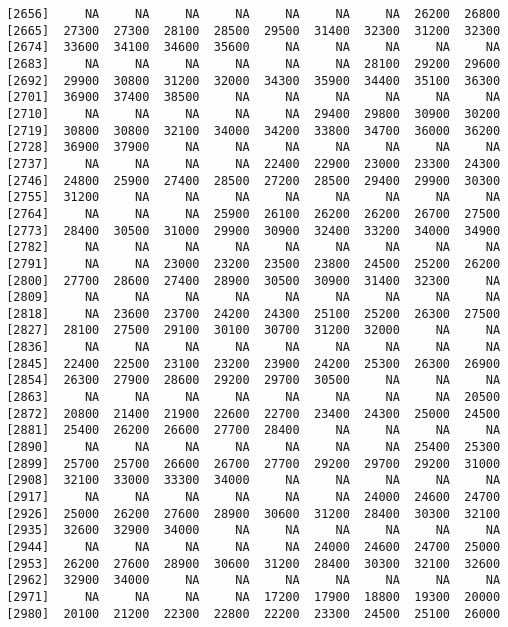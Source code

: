 \documentclass[]{article}
\begin{document}
\begin{verbatim}
 [2656]     NA     NA     NA     NA     NA     NA     NA  26200  26800
 [2665]  27300  27300  28100  28500  29500  31400  32300  31200  32300
 [2674]  33600  34100  34600  35600     NA     NA     NA     NA     NA
 [2683]     NA     NA     NA     NA     NA     NA  28100  29200  29600
 [2692]  29900  30800  31200  32000  34300  35900  34400  35100  36300
 [2701]  36900  37400  38500     NA     NA     NA     NA     NA     NA
 [2710]     NA     NA     NA     NA     NA  29400  29800  30900  30200
 [2719]  30800  30800  32100  34000  34200  33800  34700  36000  36200
 [2728]  36900  37900     NA     NA     NA     NA     NA     NA     NA
 [2737]     NA     NA     NA     NA  22400  22900  23000  23300  24300
 [2746]  24800  25900  27400  28500  27200  28500  29400  29900  30300
 [2755]  31200     NA     NA     NA     NA     NA     NA     NA     NA
 [2764]     NA     NA     NA  25900  26100  26200  26200  26700  27500
 [2773]  28400  30500  31000  29900  30900  32400  33200  34000  34900
 [2782]     NA     NA     NA     NA     NA     NA     NA     NA     NA
 [2791]     NA     NA  23000  23200  23500  23800  24500  25200  26200
 [2800]  27700  28600  27400  28900  30500  30900  31400  32300     NA
 [2809]     NA     NA     NA     NA     NA     NA     NA     NA     NA
 [2818]     NA  23600  23700  24200  24300  25100  25200  26300  27500
 [2827]  28100  27500  29100  30100  30700  31200  32000     NA     NA
 [2836]     NA     NA     NA     NA     NA     NA     NA     NA     NA
 [2845]  22400  22500  23100  23200  23900  24200  25300  26300  26900
 [2854]  26300  27900  28600  29200  29700  30500     NA     NA     NA
 [2863]     NA     NA     NA     NA     NA     NA     NA     NA  20500
 [2872]  20800  21400  21900  22600  22700  23400  24300  25000  24500
 [2881]  25400  26200  26600  27700  28400     NA     NA     NA     NA
 [2890]     NA     NA     NA     NA     NA     NA     NA  25400  25300
 [2899]  25700  25700  26600  26700  27700  29200  29700  29200  31000
 [2908]  32100  33000  33300  34000     NA     NA     NA     NA     NA
 [2917]     NA     NA     NA     NA     NA     NA  24000  24600  24700
 [2926]  25000  26200  27600  28900  30600  31200  28400  30300  32100
 [2935]  32600  32900  34000     NA     NA     NA     NA     NA     NA
 [2944]     NA     NA     NA     NA     NA  24000  24600  24700  25000
 [2953]  26200  27600  28900  30600  31200  28400  30300  32100  32600
 [2962]  32900  34000     NA     NA     NA     NA     NA     NA     NA
 [2971]     NA     NA     NA     NA  17200  17900  18800  19300  20000
 [2980]  20100  21200  22300  22800  22200  23300  24500  25100  26000

\end{verbatim}
\end{document}
